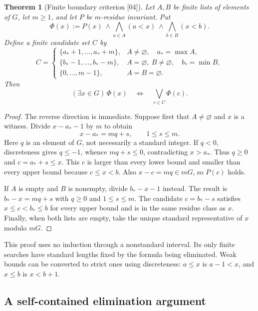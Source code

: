 \documentclass[11pt]{article}
\numberwithin{equation}{section}
\newtheorem{theorem}{Theorem}[section]
\theoremstyle{definition}
\theoremstyle{remark}
\newcommand{\src}[1]{\textup{\textsf{\small[#1]}}}
\begin{document}
\begin{theorem}[Finite boundary criterion \src{04}]\label{pma:pr:thm:boundary}
Let $A,B$ be finite lists of elements of $G$, let $m\geq1$, and let $P$ be
$m$-residue invariant. Put
\[
 \Phi(x):=P(x)\ \wedge\bigwedge_{a\in A}(a<x)
                    \ \wedge\bigwedge_{b\in B}(x<b).
\]
Define a finite candidate set $C$ by
\begin{equation}\label{pma:pr:eq:candidates}
 C=
 \begin{cases}
  \{a_*+1,\ldots,a_*+m\},&A\ne\varnothing,\quad a_*=\max A,\\
  \{b_*-1,\ldots,b_*-m\},&A=\varnothing,\ B\ne\varnothing,\quad b_*=\min B,\\
  \{0,\ldots,m-1\},&A=B=\varnothing.
 \end{cases}
\end{equation}
Then
\begin{equation}\label{pma:pr:eq:boundaryequivalence}
 (\exists x\in G)\,\Phi(x)\quad\Longleftrightarrow\quad
 \bigvee_{c\in C}\Phi(c).
\end{equation}
\end{theorem}

\begin{proof}
The reverse direction is immediate. Suppose first that $A\ne\varnothing$
and $x$ is a witness. Divide $x-a_*-1$ by $m$ to obtain
\[
 x-a_*=mq+s,\qquad 1\leq s\leq m.
\]
Here $q$ is an element of $G$, not necessarily a standard integer. If
$q<0$, discreteness gives $q\leq-1$, whence $mq+s\leq0$, contradicting
$x>a_*$. Thus $q\geq0$ and $c=a_*+s\leq x$. This $c$ is larger than every
lower bound and smaller than every upper bound because $c\leq x<b$.
Also $x-c=mq\in mG$, so $P(c)$ holds.

If $A$ is empty and $B$ is nonempty, divide $b_*-x-1$ instead. The result is
$b_*-x=mq+s$ with $q\geq0$ and $1\leq s\leq m$. The candidate
$c=b_*-s$ satisfies $x\leq c<b_*\leq b$ for every upper bound and is in
the same residue class as $x$. Finally, when both lists are empty, take the
unique standard representative of $x$ modulo $mG$.
\end{proof}

This proof uses no induction through a nonstandard interval. Its only
finite searches have standard lengths fixed by the formula being
eliminated. Weak bounds can be converted to strict ones using discreteness:
$a\leq x$ is $a-1<x$, and $x\leq b$ is $x<b+1$.

\subsection{A self-contained elimination argument}
\end{document}

